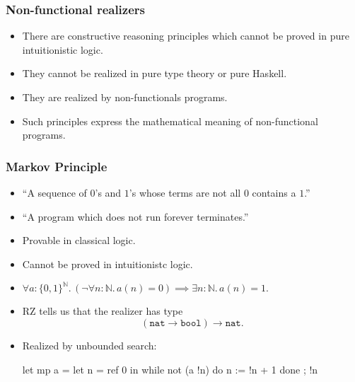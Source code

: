 \documentclass[t]{beamer}
\newcommand{\NN}{\mathbb{N}}
\begin{document}
\begin{frame}
  \frametitle{Non-functional realizers}

  \begin{itemize}
  \item There are constructive reasoning principles which cannot be
    proved in pure intuitionistic logic.
  \item They cannot be realized in pure type theory or pure Haskell.
  \item They are realized by non-functionals programs.
  \item Such principles express the mathematical meaning of
    non-functional programs.
  \end{itemize}

\end{frame}

\begin{frame}[fragile]
  \frametitle{Markov Principle}

  \begin{itemize}
  \item ``A sequence of $0$'s and $1$'s whose terms are not all $0$
    contains a $1$.''
  \item ``A program which does not run forever terminates.''
  \item Provable in classical logic.
  \item Cannot be proved in intuitionistc logic.
  \item $\forall a : \{0,1\}^\NN .\,
    (\lnot \forall n : \NN .\, a(n) = 0) \implies
    \exists n : \NN .\, a(n) = 1.$
  \item RZ tells us that the realizer has type
    \begin{equation*}
      (\mathtt{nat} \to \mathtt{bool}) \to \mathtt{nat}.
    \end{equation*}
  \item Realized by unbounded search:
    \begin{source}
let mp a =
  let n = ref 0 in
    while not (a !n) do n := !n + 1 done ;
    !n      
    \end{source}
  \end{itemize}
\end{frame}
\end{document}
